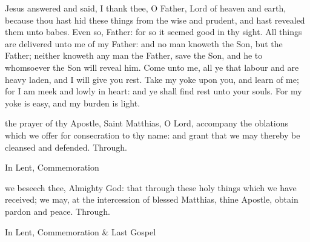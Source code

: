 
\tractnotice


 Jesus answered and said, I thank thee, O Father, Lord of heaven and earth, because thou hast hid these things from the wise and prudent, and hast revealed them unto babes. Even so, Father: for so it seemed good in thy sight. All things are delivered unto me of my Father: and no man knoweth the Son, but the Father; neither knoweth any man the Father, save the Son, and he to whomsoever the Son will reveal him. Come unto me, all ye that labour and are heavy laden, and I will give you rest. Take my yoke upon you, and learn of me; for I am meek and lowly in heart: and ye shall find rest unto your souls. For my yoke is easy, and my burden is light.


\secret
{} the prayer of thy Apostle, Saint Matthias, O Lord, accompany the oblations which we offer for consecration to thy name: and grant that we may thereby be cleansed and defended. Through.
\begin{rubric}
    In Lent, Commemoration %
\end{rubric}


\postcommunion
{} we beseech thee, Almighty God: that through these holy things which we have received; we may, at the intercession of blessed Matthias, thine Apostle, obtain pardon and peace. Through.
\begin{rubric}
    In Lent, Commemoration \& Last Gospel 
\end{rubric}


